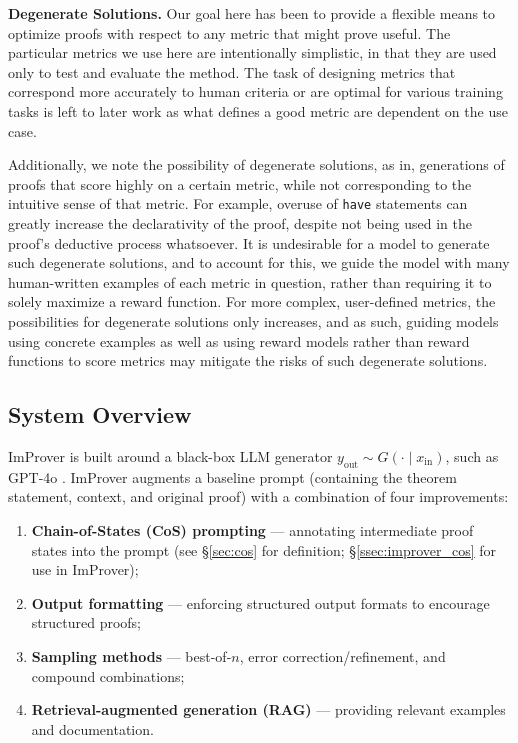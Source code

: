 \textbf{Degenerate Solutions.} Our goal here has been to provide a flexible means to optimize proofs with respect to any metric that might prove useful. The particular metrics we use here are intentionally simplistic, in that they are used only to test and evaluate the method. The task of designing metrics that correspond more accurately to human criteria or are optimal for various training tasks is left to later work as what defines a good metric are dependent on the use case.

Additionally, we note the possibility of degenerate solutions, as in, generations of proofs that score highly on a certain metric, while not corresponding to the intuitive sense of that metric. For example, overuse of \texttt{have} statements can greatly increase the declarativity of the proof, despite not being used in the proof's deductive process whatsoever. It is undesirable for a model to generate such degenerate solutions, and to account for this, we guide the model with many human-written examples of each metric in question, rather than requiring it to solely maximize a reward function. For more complex, user-defined metrics, the possibilities for degenerate solutions only increases, and as such, guiding models using concrete examples as well as using reward models rather than reward functions to score metrics may mitigate the risks of such degenerate solutions.

\subsection{System Overview}
\label{sec:improver_overview}

ImProver is built around a black-box LLM generator $y_{\mathrm{out}} \sim G(\cdot \mid x_{\mathrm{in}})$, such as GPT-4o \cite{openai2024gpt4technicalreport}. ImProver augments a baseline prompt (containing the theorem statement, context, and original proof) with a combination of four improvements:
\begin{enumerate}
    \item \textbf{Chain-of-States (CoS) prompting} --- annotating intermediate proof states into the prompt (see \S\ref{sec:cos} for definition; \S\ref{ssec:improver_cos} for use in ImProver);
    \item \textbf{Output formatting} --- enforcing structured output formats to encourage structured proofs;
    \item \textbf{Sampling methods} --- best-of-$n$, error correction/refinement, and compound combinations;
    \item \textbf{Retrieval-augmented generation (RAG)} --- providing relevant examples and documentation.
\end{enumerate}

